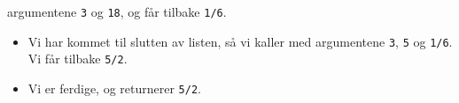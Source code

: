 \documentclass{beamer}
\begin{document}
\begin{frame}[fragile, t]
\begin{overprint}
\begin{itemize}
      argumentene {\tt 3} og {\tt 18}, og får tilbake {\tt 1/6}.
    \end{itemize}
    \begin{semiverbatim}
    \end{semiverbatim}
    \begin{itemize}
    \item<16-> Vi har kommet til slutten av listen, så vi kaller {\tt *} med
      argumentene {\tt 3}, {\tt 5} og {\tt 1/6}. Vi får tilbake {\tt 5/2}.
    \item<17-> Vi er ferdige, og returnerer {\tt 5/2}.
    \end{itemize}
  \end{overprint}

\end{frame}
\end{document}
